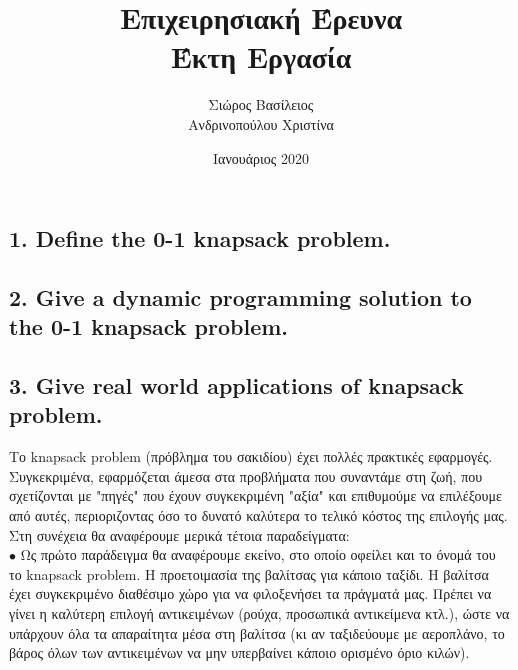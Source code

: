 \documentclass[12pt]{article}
\title{\hugeΑλγοριθμική Επιχειρησιακή Έρευνα\\Έκτη Εργασία}
\author{Σιώρος Βασίλειος\\Ανδρινοπούλου Χριστίνα}
\date{Ιανουάριος 2020}
\begin{document}
\maketitle


\pagebreak


\subsection*{1. Define the 0-1 knapsack problem.}



\vspace{2in}

\pagebreak

\subsection*{2. Give a dynamic programming solution to the 0-1 knapsack problem.}


\vspace{2in}

\pagebreak

\subsection*{3. Give real world applications of knapsack problem.}

Το knapsack problem (πρόβλημα του σακιδίου) έχει πολλές πρακτικές εφαρμογές. Συγκεκριμένα, εφαρμόζεται άμεσα  στα προβλήματα που συναντάμε στη ζωή, που σχετίζονται με "πηγές" που έχουν συγκεκριμένη "αξία" και επιθυμούμε να επιλέξουμε από αυτές, περιοριζοντας όσο το δυνατό καλύτερα το τελικό κόστος της επιλογής μας.\\

Στη συνέχεια θα αναφέρουμε μερικά τέτοια παραδείγματα: \\
\(\bullet\) Ως πρώτο παράδειγμα θα αναφέρουμε εκείνο, στο οποίο οφείλει και το όνομά του το knapsack problem. Η προετοιμασία της βαλίτσας για κάποιο ταξίδι. Η βαλίτσα έχει συγκεκριμένο διαθέσιμο χώρο για να φιλοξενήσει τα πράγματά μας. Πρέπει να γίνει η καλύτερη επιλογή αντικειμένων (ρούχα, προσωπικά αντικείμενα κτλ.), ώστε να υπάρχουν όλα τα απαραίτητα μέσα στη βαλίτσα (κι αν ταξιδεύουμε με αεροπλάνο, το βάρος όλων των αντικειμένων να μην υπερβαίνει κάποιο ορισμένο όριο κιλών). \\
\end{document}
